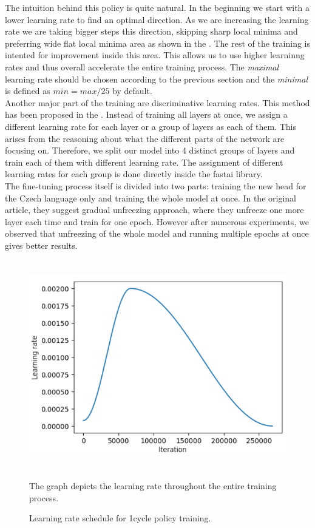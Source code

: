 The intuition behind this policy is quite natural. In the beginning we start with a lower learning rate to find an optimal direction. As we are increasing the learning rate we are taking bigger steps this direction, skipping sharp local minima and preferring wide flat local minima area as shown in the \citet{smith2019super}. The rest of the training is intented for improvement inside this area. This allows us to use higher learninng rates and thus overall accelerate the entire training process. The \textit{maximal} learning rate should be chosen according to the previous section and the \textit{minimal} is defined as $ min = max / 25$ by default.\\

Another major part of the training are discriminative learning rates. This method has been proposed in the \citet{howard2018universal}. Instead of training all layers at once, we assign a different learning rate for each layer or a group of layers as each of them. This arises from the reasoning about what the different parts of the network are focusing on. Therefore, we split our model into 4 distinct groups of layers and train each of them with different learning rate. The assignment of different learning rates for each group is done directly inside the fastai library.\\

The fine-tuning process itself is divided into two parts: training the new head for the Czech language only and training the whole model at once. In the original article, they suggest gradual unfreezing approach, where they unfreeze one more layer each time and train for one epoch. However after numerous experiments, we observed that unfreezing of the whole model and running multiple epochs at once gives better results.

\begin{figure}[h]\centering
\includegraphics[width=130mm, height=91mm]{../img/lrSchedule}
\caption{Learning rate schedule for 1cycle policy training.}
\label{fig03:lrSchedule}
The graph depicts the learning rate throughout the entire training process.
\end{figure}

